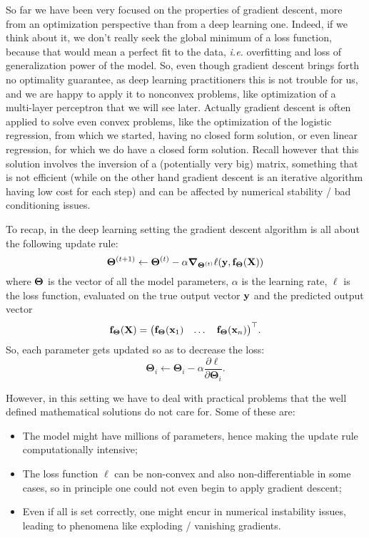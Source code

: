 
So far we have been very focused on the properties of gradient descent, more from an optimization perspective than from a deep learning one. Indeed, if we think about it, we don't really seek the global minimum of a loss function, because that would mean a perfect fit to the data, \textit{i.e.} overfitting and loss of generalization power of the model. So, even though gradient descent brings forth no optimality guarantee, as deep learning practitioners this is not trouble for us, and we are happy to apply it to nonconvex problems, like optimization of a multi-layer perceptron that we will see later. 
Actually gradient descent is often applied to solve even convex problems, like the optimization of the logistic regression, from which we started, having no closed form solution, or even linear regression, for which we do have a closed form solution. Recall however that this solution involves the inversion of a (potentially very big) matrix, something that is not efficient (while on the other hand gradient descent is an iterative algorithm having low cost for each step) and can be affected by numerical stability / bad conditioning issues.

To recap, in the deep learning setting the gradient descent algorithm is all about the following update rule:
\begin{equation}
    \vb*{\Theta}^{(t+1)} \gets \vb*{\Theta}^{(t)} - \alpha \gradient_{\vb*{\Theta}^{(t)}} \ell(\vb{y}, \vb{f}_{\vb*{\Theta}}(\vb{X}))
\end{equation}
where $\vb*{\Theta}$ is the vector of all the model parameters, $\alpha$ is the learning rate, $\ell$ is the loss function, evaluated on the true output vector $\vb{y}$ and the predicted output vector
\begin{equation*}
    \vb{f}_{\vb*{\Theta}}(\vb{X}) = \mqty( \vb{f}_{\vb*{\Theta}}(\vb{x}_1) & \dots & 
    \vb{f}_{\vb*{\Theta}}(\vb{x}_n) )^{\top}.
\end{equation*}
So, each parameter gets updated so as to decrease the loss:
\begin{equation}
    \bm{\Theta}_i \leftarrow  \bm{\Theta}_i - \alpha \frac{\partial \ell}{\partial \bm{\Theta}_i}.
\end{equation}

However, in this setting we have to deal with practical problems that the well defined mathematical solutions do not care for. Some of these are:
\begin{itemize}
    \item The model might have millions of parameters, hence making the update rule computationally intensive;
    \item The loss function $\ell$ can be non-convex and also non-differentiable in some cases, so in principle one could not even begin to apply gradient descent;
    \item Even if all is set correctly, one might encur in numerical instability issues, leading to phenomena like exploding / vanishing gradients.
\end{itemize}

